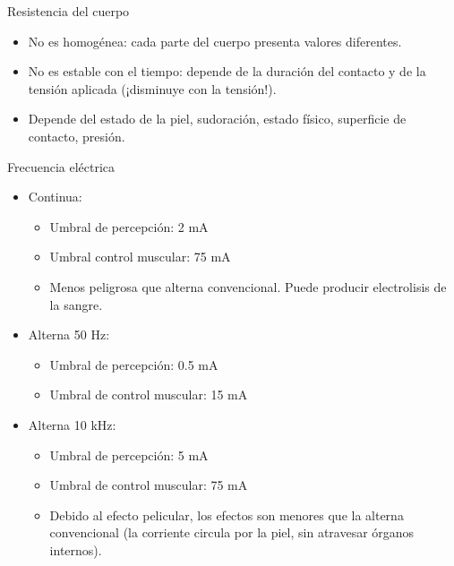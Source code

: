 \documentclass[aspectratio=169, usenames,svgnames,dvipsnames]{beamer}
\begin{document}
\begin{frame}[label={sec:orge621e91}]{Resistencia del cuerpo}
\begin{itemize}
\item \alert{No es homogénea}: cada parte del cuerpo presenta valores diferentes.

\item \alert{No es estable con el tiempo}: depende de la duración del contacto
y de la tensión aplicada (¡disminuye con la tensión!).

\item Depende del estado de la piel, sudoración, estado físico, superficie
de contacto, presión.
\end{itemize}
\end{frame}

\begin{frame}[label={sec:org4e2ad64}]{Frecuencia eléctrica}
\begin{itemize}
\item Continua:

\begin{itemize}
\item Umbral de percepción: 2 mA

\item Umbral control muscular: 75 mA

\item Menos peligrosa que alterna convencional. Puede producir
electrolisis de la sangre.
\end{itemize}

\item Alterna 50 Hz:

\begin{itemize}
\item Umbral de percepción: 0.5 mA

\item Umbral de control muscular: 15 mA
\end{itemize}

\item Alterna 10 kHz:

\begin{itemize}
\item Umbral de percepción: 5 mA

\item Umbral de control muscular: 75 mA

\item Debido al efecto pelicular, los efectos son menores que la alterna
convencional (la corriente circula por la piel, sin atravesar
órganos internos).
\end{itemize}
\end{itemize}
\end{frame}
\end{document}
